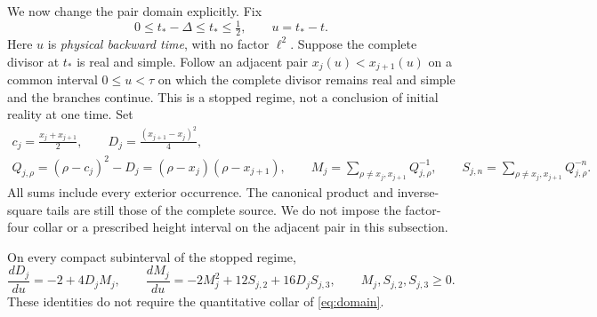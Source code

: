 We now change the pair domain explicitly. Fix
\begin{equation}
 0\le t_*-\Delta\le t_*\le\tfrac12,
 \qquad u=t_*-t.
 \label{stat:slab}
\end{equation}
Here $u$ is \emph{physical backward time}, with no factor $\ell^2$.
Suppose the complete divisor at $t_*$ is real and simple. Follow an
adjacent pair $x_j(u)<x_{j+1}(u)$ on a common interval $0\le u<\tau$
on which the complete divisor remains real and simple and the branches
continue. This is a stopped regime, not a conclusion of initial reality
at one time. Set
\begin{equation}
 \begin{gathered}
 c_j=\frac{x_j+x_{j+1}}2,\qquad
 D_j=\frac{(x_{j+1}-x_j)^2}{4},\\
 Q_{j,\rho}=(\rho-c_j)^2-D_j
             =(\rho-x_j)(\rho-x_{j+1}),\qquad
 M_j=\sum_{\rho\ne x_j,x_{j+1}}Q_{j,\rho}^{-1},\qquad
 S_{j,n}=\sum_{\rho\ne x_j,x_{j+1}}Q_{j,\rho}^{-n}.
 \end{gathered}
 \label{stat:real-moments}
\end{equation}
All sums include every exterior occurrence. The canonical product and
inverse-square tails are still those of the complete source.
We do not impose the factor-four collar or a prescribed height interval
on the adjacent pair in this subsection.

\begin{lemma}
\label{stat:strict-isolation}
On every compact subinterval of the stopped regime,
\begin{equation}
 \frac{dD_j}{du}=-2+4D_jM_j,
 \qquad
 \frac{dM_j}{du}=-2M_j^2+12S_{j,2}+16D_jS_{j,3},
 \qquad M_j,S_{j,2},S_{j,3}\ge0.
 \label{stat:backward-system}
\end{equation}
These identities do not require the quantitative collar of
\eqref{eq:domain}.
\end{lemma}

